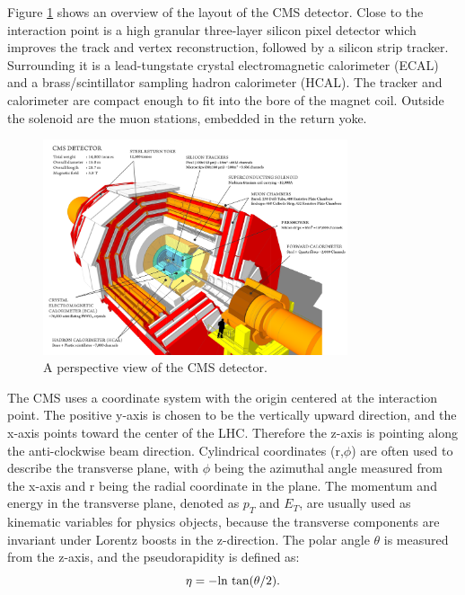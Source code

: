 \documentclass[thesis.tex]{subfiles}
\begin{document}
Figure \ref{fig:cmslayout} shows an overview of the layout of the CMS detector. Close to the interaction point is a high granular three-layer silicon pixel detector which improves the track and vertex reconstruction, followed by a silicon strip tracker. Surrounding it is a lead-tungstate crystal electromagnetic calorimeter (ECAL) and a brass/scintillator sampling hadron calorimeter (HCAL). The tracker and calorimeter are compact enough to fit into the bore of the magnet coil. Outside the solenoid are the muon stations, embedded in the return yoke. 

\begin{figure}[hbt]
	\centering
	\includegraphics[width=0.8\textwidth]{plot/cms_layout.png}
	\caption{A perspective view of the CMS detector.}
	\label{fig:cmslayout}
\end{figure}

The CMS uses a coordinate system with the origin centered at the interaction point. The positive y-axis is chosen to be the vertically upward direction, and the x-axis points toward the center of the LHC. Therefore the z-axis is pointing along the anti-clockwise beam direction. Cylindrical coordinates (r,$\phi$) are often used to describe the transverse plane, with $\phi$ being the azimuthal angle measured from the x-axis and r being the radial coordinate in the plane. The momentum and energy in the transverse plane, denoted as $p_T$ and $E_T$, are usually used as kinematic variables for physics objects, because the transverse components are invariant under Lorentz boosts in the z-direction. The polar angle $\theta$ is measured from the z-axis, and the pseudorapidity is defined as: 
\begin{equation}
	\centering
       \eta = -\text{ln tan}(\theta/2).
\end{equation}
\end{document}
